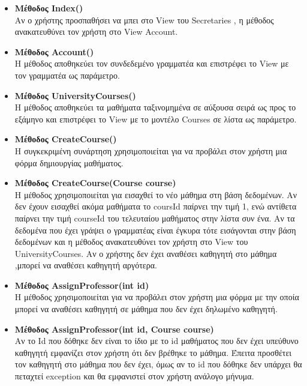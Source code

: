 \documentclass[12pt]{article}
\begin{document}
	\begin{itemize}
		
		\item \textbf{Μέθοδος Index()}\\
		Αν ο χρήστης προσπαθήσει να μπει στο View του Secretaries , η μέθοδος ανακατευθύνει τον χρήστη στο View Account.		
		
		\item \textbf{Μέθοδος Account()}\\
		Η μέθοδος αποθηκεύει τον συνδεδεμένο γραμματέα και επιστρέφει το View με τον γραμματέα ως παράμετρο.		
		
		\item \textbf{Μέθοδος UniversityCourses()}\\
		Η μέθοδος αποθηκεύει τα μαθήματα ταξινομημένα σε αύξουσα σειρά ως προς το εξάμηνο και επιστρέφει το View με το μοντέλο Courses σε λίστα ως παράμετρο.		
			
		\item \textbf{Μέθοδος CreateCourse()}\\
		Η συγκεκριμένη συνάρτηση χρησιμοποιείται για να προβάλει στον χρήστη μια φόρμα δημιουργίας μαθήματος.

		\item \textbf{Μέθοδος CreateCourse(Course course)}\\
		Η μέθοδος χρησιμοποιείται για εισαχθεί το νέο μάθημα στη βάση δεδομένων. Αν δεν έχουν εισαχθεί ακόμα μαθήματα το coursId παίρνει την τιμή 1, ενώ αντίθετα παίρνει την τιμή courseId του τελευταίου μαθήματος στην λίστα συν ένα. Αν τα δεδομένα που έχει γράψει ο γραμματέας είναι έγκυρα τότε εισάγονται στην βάση δεδομένων και η μέθοδος ανακατευθύνει τον χρήστη στο View του UniversityCourses. Αν ο χρήστης δεν έχει αναθέσει καθηγητή στο μάθημα ,μπορεί να αναθέσει καθηγητή αργότερα.		
		
		\item \textbf{Μέθοδος AssignProfessor(int id)}\\
		Η μέθοδος χρησιμοποιείται για να προβάλει στον χρήστη μια φόρμα με την οποία μπορεί να αναθέσει καθηγητή σε μάθημα που δεν έχει δηλωμένο καθηγητή.				

		\item \textbf{Μέθοδος AssignProfessor(int id, Course course)}\\
		Αν το Id που δόθηκε δεν είναι το ίδιο με το id μαθήματος που δεν έχει υπεύθυνο καθηγητή  εμφανίζει στον χρήστη ότι δεν βρέθηκε το μάθημα. Έπειτα προσθέτει τον καθηγητή στο μάθημα που δεν έχει, όμως αν το id που δόθηκε δεν υπάρχει θα πεταχτεί exception και θα εμφανιστεί στον χρήστη ανάλογο μήνυμα.


\end{itemize}
\end{document}
